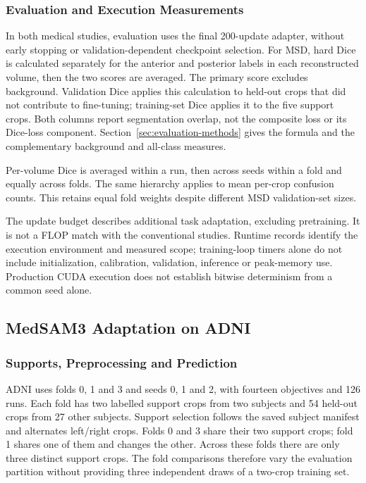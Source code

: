 \documentclass[12pt,a4paper]{article}
\begin{document}
\subsubsection{Evaluation and Execution Measurements}

In both medical studies, evaluation uses the final 200-update adapter,
without early stopping or validation-dependent checkpoint selection.
For MSD, hard Dice is calculated separately for the anterior and
posterior labels in each reconstructed volume, then the two scores are
averaged. The primary score excludes background. Validation Dice applies
this calculation to held-out crops that did not contribute to
fine-tuning; training-set Dice applies it to the five support crops.
Both columns report segmentation overlap, not the composite loss or its
Dice-loss component. Section~\ref{sec:evaluation-methods} gives the
formula and the complementary background and all-class measures.

Per-volume Dice is averaged within a run, then across seeds within a
fold and equally across folds. The same hierarchy applies to mean
per-crop confusion counts. This retains equal fold weights despite
different MSD validation-set sizes.

The update budget describes additional task adaptation, excluding
pretraining. It is not a FLOP match with the conventional studies.
Runtime records identify the execution environment and measured scope;
training-loop timers alone do not include initialization, calibration,
validation, inference or peak-memory use. Production CUDA execution
does not establish bitwise determinism from a common seed alone.

\subsection{MedSAM3 Adaptation on ADNI}
\label{sec:medsam-adni-methods}

\subsubsection{Supports, Preprocessing and Prediction}

ADNI uses folds 0, 1 and 3 and seeds 0, 1 and 2, with fourteen objectives
and 126 runs. Each fold has two labelled support crops from two subjects
and 54 held-out crops from 27 other subjects. Support selection follows
the saved subject manifest and alternates left/right crops. Folds 0 and
3 share their two support crops; fold 1 shares one of them and changes
the other. Across these folds there are only three distinct support
crops. The fold comparisons therefore vary the evaluation partition
without providing three independent draws of a two-crop training set.
\end{document}

